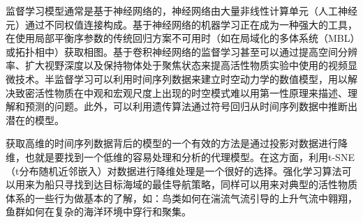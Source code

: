 监督学习模型通常是基于神经网络的，神经网络由大量非线性计算单元（人工神经元）通过不同权值连接构成。基于神经网络的机器学习正在成为一种强大的工具，在使用局部平衡序参数的传统回归方案不可用时（如在局域化的多体系统（MBL）或拓扑相中）获取相图\cite{PhysRevLett.120.257204}。基于卷积神经网络的监督学习甚至可以通过提高空间分辨率、扩大视野深度以及保持物体处于聚焦状态来提高活性物质实验中使用的视频显微技术。半监督学习可以利用时间序列数据来建立时空动力学的数值模型，用以解决致密活性物质在中观和宏观尺度上出现的时空模式难以用第一性原理来描述、理解和预测的问题。此外，可以利用遗传算法通过符号回归从时间序列数据中推断出潜在的模型\cite{MLAM}。

获取高维的时间序列数据背后的模型的一个有效的方法是通过投影对数据进行降维，也就是要找到一个低维的容易处理和分析的代理模型\cite{MLAM, MLPM}。在这方面，利用t-SNE（t分布随机近邻嵌入）\cite{JMLR}对数据进行降维处理是一个很好的选择。强化学习算法可以用来为船只寻找到达目标海域的最佳导航策略，同样可以用来对典型的活性物质体系的一些行为做基本的了解\cite{MLAM}，如：鸟类如何在湍流气流引导的上升气流中翱翔，鱼群如何在复杂的海洋环境中穿行和聚集。


